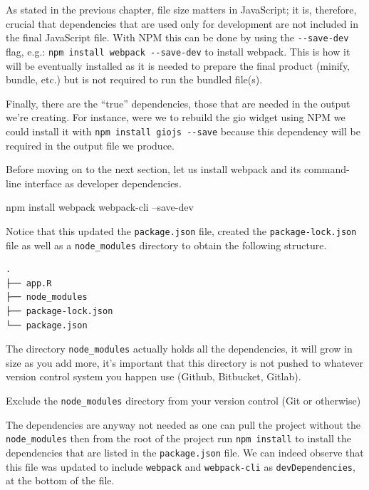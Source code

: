 \documentclass[10pt,]{krantz}
\makeatletter
\newenvironment{Shaded}{\begin{snugshade}}{\end{snugshade}}
\newcommand{\ExtensionTok}[1]{#1}
\newcommand{\NormalTok}[1]{#1}
\newenvironment{kframe}{%
\medskip{}
\setlength{\fboxsep}{.8em}
 \def\at@end@of@kframe{}%
 \ifinner\ifhmode%
  \def\at@end@of@kframe{\end{minipage}}%
  \begin{minipage}{\columnwidth}%
 \fi\fi%
 \def\FrameCommand##1{\hskip\@totalleftmargin \hskip-\fboxsep
 \colorbox{shadecolor}{##1}\hskip-\fboxsep
     \hskip-\linewidth \hskip-\@totalleftmargin \hskip\columnwidth}%
 \MakeFramed {\advance\hsize-\width
   \@totalleftmargin\z@ \linewidth\hsize
   \@setminipage}}%
 {\par\unskip\endMakeFramed%
 \at@end@of@kframe}
\renewenvironment{Shaded}{\begin{kframe}}{\end{kframe}}
\newenvironment{rmdblock}[1]
  {
  \begin{itemize}
  \renewcommand{\labelitemi}{
    \raisebox{-.7\height}[0pt][0pt]{
      {\setkeys{Gin}{width=3em,keepaspectratio}\texttt{[image: images/\#1]}}
    }
  }
  \setlength{\fboxsep}{1em}
  \begin{kframe}
  \item
  }
  {
  \end{kframe}
  \end{itemize}
  }
\newenvironment{rmdnote}
  {\begin{rmdblock}{note}}
  {\end{rmdblock}}
\makeatother
\begin{document}
As stated in the previous chapter, file size matters in JavaScript; it is, therefore, crucial that dependencies that are used only for development are not included in the final JavaScript file. With NPM this can be done by using the \texttt{-\/-save-dev} flag, e.g.: \texttt{npm\ install\ webpack\ -\/-save-dev} to install webpack. This is how it will be eventually installed as it is needed to prepare the final product (minify, bundle, etc.) but is not required to run the bundled file(s).

Finally, there are the ``true'' dependencies, those that are needed in the output we're creating. For instance, were we to rebuild the gio widget using NPM we could install it with \texttt{npm\ install\ giojs\ -\/-save} because this dependency will be required in the output file we produce.

Before moving on to the next section, let us install webpack and its command-line interface as developer dependencies.

\begin{Shaded}
\begin{Highlighting}[]
\ExtensionTok{npm}\NormalTok{ install webpack webpack-cli --save-dev}
\end{Highlighting}
\end{Shaded}

Notice that this updated the \texttt{package.json} file, created the \texttt{package-lock.json} file as well as a \texttt{node\_modules} directory to obtain the following structure.

\begin{verbatim}
.
├── app.R
├── node_modules
├── package-lock.json
└── package.json
\end{verbatim}

The directory \texttt{node\_modules} actually holds all the dependencies, it will grow in size as you add more, it's important that this directory is not pushed to whatever version control system you happen use (Github, Bitbucket, Gitlab).

\begin{rmdnote}
Exclude the \texttt{node\_modules} directory from your version control
(Git or otherwise)
\end{rmdnote}

The dependencies are anyway not needed as one can pull the project without the \texttt{node\_modules} then from the root of the project run \texttt{npm\ install} to install the dependencies that are listed in the \texttt{package.json} file. We can indeed observe that this file was updated to include \texttt{webpack} and \texttt{webpack-cli} as \texttt{devDependencies}, at the bottom of the file.
\end{document}

